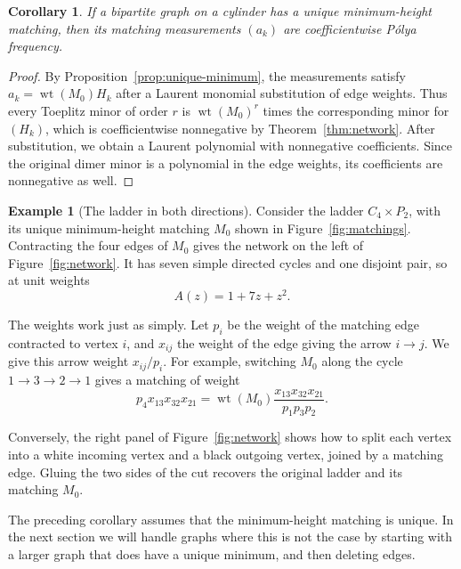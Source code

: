 \documentclass[11pt]{article}
\newtheorem{corollary}[theorem]{Corollary}
\theoremstyle{definition}
\newtheorem{example}[theorem]{Example}
\theoremstyle{remark}
\newcommand{\wt}{\operatorname{wt}}
\begin{document}
\begin{corollary}\label{cor:unique-minimum}
If a bipartite graph on a cylinder has a unique
minimum-height matching, then its matching
measurements $(a_k)$ are coefficientwise
P\'olya frequency.
\end{corollary}

\begin{proof}
By Proposition~\ref{prop:unique-minimum},
the measurements satisfy
$a_k=\wt(M_0)H_k$ after a Laurent monomial
substitution of edge weights. Thus every
Toeplitz minor of order $r$ is $\wt(M_0)^r$
times the corresponding minor for $(H_k)$,
which is coefficientwise nonnegative by
Theorem~\ref{thm:network}. After substitution,
we obtain a Laurent polynomial with nonnegative
coefficients. Since the original dimer minor
is a polynomial in the edge weights, its
coefficients are nonnegative as well.
\end{proof}



\begin{example}[The ladder in both directions]
\label{ex:ladder-correspondence}
Consider the ladder $C_4\times P_2$, with its unique
minimum-height matching $M_0$ shown in
Figure~\ref{fig:matchings}. Contracting the four
edges of $M_0$ gives the network on the left of
Figure~\ref{fig:network}. It has seven simple
directed cycles and one disjoint pair, so at
unit weights
\[
A(z)=1+7z+z^2.
\]

The weights work just as simply. Let $p_i$ be
the weight of the matching edge contracted to
vertex $i$, and $x_{ij}$ the weight of the edge
giving the arrow $i\to j$. We give this arrow
weight $x_{ij}/p_i$. For example, switching
$M_0$ along the cycle $1\to3\to2\to1$ gives
a matching of weight
\[
p_4x_{13}x_{32}x_{21}
=\wt(M_0)\frac{x_{13}x_{32}x_{21}}{p_1p_3p_2}.
\]

Conversely, the right panel of
Figure~\ref{fig:network} shows how to split each
vertex into a white incoming vertex and a black
outgoing vertex, joined by a matching edge.
Gluing the two sides of the cut recovers the
original ladder and its matching $M_0$.
\end{example}



The preceding corollary assumes that the minimum-height
matching is unique. In the next section we will handle graphs where this is
not the case by starting with a larger graph that does
have a unique minimum, and then deleting edges.
\end{document}
